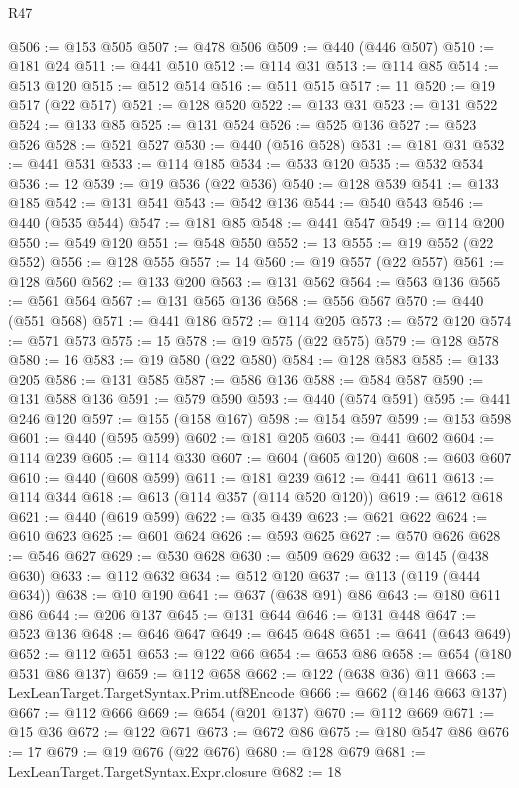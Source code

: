 \begin{lexlean}{R47}
\begin{coremodule}
@506 := @153 @505
@507 := @478 @506
@509 := @440 (@446 @507)
@510 := @181 @24
@511 := @441 @510
@512 := @114 @31
@513 := @114 @85
@514 := @513 @120
@515 := @512 @514
@516 := @511 @515
@517 := 11
@520 := @19 @517 (@22 @517)
@521 := @128 @520
@522 := @133 @31
@523 := @131 @522
@524 := @133 @85
@525 := @131 @524
@526 := @525 @136
@527 := @523 @526
@528 := @521 @527
@530 := @440 (@516 @528)
@531 := @181 @31
@532 := @441 @531
@533 := @114 @185
@534 := @533 @120
@535 := @532 @534
@536 := 12
@539 := @19 @536 (@22 @536)
@540 := @128 @539
@541 := @133 @185
@542 := @131 @541
@543 := @542 @136
@544 := @540 @543
@546 := @440 (@535 @544)
@547 := @181 @85
@548 := @441 @547
@549 := @114 @200
@550 := @549 @120
@551 := @548 @550
@552 := 13
@555 := @19 @552 (@22 @552)
@556 := @128 @555
@557 := 14
@560 := @19 @557 (@22 @557)
@561 := @128 @560
@562 := @133 @200
@563 := @131 @562
@564 := @563 @136
@565 := @561 @564
@567 := @131 @565 @136
@568 := @556 @567
@570 := @440 (@551 @568)
@571 := @441 @186
@572 := @114 @205
@573 := @572 @120
@574 := @571 @573
@575 := 15
@578 := @19 @575 (@22 @575)
@579 := @128 @578
@580 := 16
@583 := @19 @580 (@22 @580)
@584 := @128 @583
@585 := @133 @205
@586 := @131 @585
@587 := @586 @136
@588 := @584 @587
@590 := @131 @588 @136
@591 := @579 @590
@593 := @440 (@574 @591)
@595 := @441 @246 @120
@597 := @155 (@158 @167)
@598 := @154 @597
@599 := @153 @598
@601 := @440 (@595 @599)
@602 := @181 @205
@603 := @441 @602
@604 := @114 @239
@605 := @114 @330
@607 := @604 (@605 @120)
@608 := @603 @607
@610 := @440 (@608 @599)
@611 := @181 @239
@612 := @441 @611
@613 := @114 @344
@618 := @613 (@114 @357 (@114 @520 @120))
@619 := @612 @618
@621 := @440 (@619 @599)
@622 := @35 @439
@623 := @621 @622
@624 := @610 @623
@625 := @601 @624
@626 := @593 @625
@627 := @570 @626
@628 := @546 @627
@629 := @530 @628
@630 := @509 @629
@632 := @145 (@438 @630)
@633 := @112 @632
@634 := @512 @120
@637 := @113 (@119 (@444 @634))
@638 := @10 @190
@641 := @637 (@638 @91) @86
@643 := @180 @611 @86
@644 := @206 @137
@645 := @131 @644
@646 := @131 @448
@647 := @523 @136
@648 := @646 @647
@649 := @645 @648
@651 := @641 (@643 @649)
@652 := @112 @651
@653 := @122 @66
@654 := @653 @86
@658 := @654 (@180 @531 @86 @137)
@659 := @112 @658
@662 := @122 (@638 @36) @11
@663 := LexLeanTarget.TargetSyntax.Prim.utf8Encode
@666 := @662 (@146 @663 @137)
@667 := @112 @666
@669 := @654 (@201 @137)
@670 := @112 @669
@671 := @15 @36
@672 := @122 @671
@673 := @672 @86
@675 := @180 @547 @86
@676 := 17
@679 := @19 @676 (@22 @676)
@680 := @128 @679
@681 := LexLeanTarget.TargetSyntax.Expr.closure
@682 := 18

\end{coremodule}
\end{lexlean}
